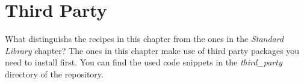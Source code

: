 
\chapter{Third Party}

What distinguishs the recipes in this chapter from the ones in the \textit{Standard Library} chapter?
The ones in this chapter make use of third party packages you need to install first.
You can find the used code snippets in the \textit{third\_party} directory of the repository.






